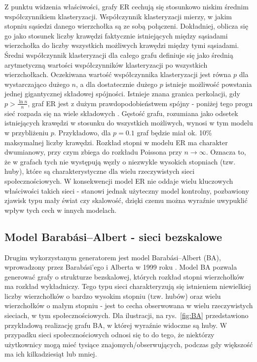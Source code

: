 Z punktu widzenia właściwości, grafy ER cechują się stosunkowo niskim średnim współczynnikiem klasteryzacji.
Współczynnik klasteryzacji mierzy, w jakim stopniu sąsiedzi danego wierzchołka są ze sobą połączeni. 
Dokładniej, oblicza się go jako stosunek liczby krawędzi faktycznie istniejących między sąsiadami wierzchołka do liczby wszystkich możliwych krawędzi między tymi sąsiadami. 
Średni współczynnik klasteryzacji dla całego grafu definiuje się jako średnią arytmetyczną wartości współczynników klasteryzacji po wszystkich wierzchołkach.
Oczekiwana wartość współczynnika klasteryzacji jest równa $p$ dla wystarczająco dużego $n$, a dla dostatecznie dużego $p$ istnieje możliwość powstania jednej gigantycznej składowej spójności.
Istnieje znana granica perkolacji, gdy $p>\frac{\ln n}{n}$, graf ER jest z dużym prawdopodobieństwem spójny - poniżej tego progu sieć rozpada się na wiele składowych \cite{ErdosRenyi1960}. Gęstość grafu, rozumiana jako odsetek istniejących krawędzi w stosunku do wszystkich możliwych, wynosi w tym modelu w przybliżeniu $p$. Przykładowo, dla $p=0.1$ graf będzie miał ok. 10\% maksymalnej liczby krawędzi. Rozkład stopni w modelu ER ma charakter dwumianowy, przy czym zbiega do rozkładu Poissona przy $n\to\infty$. Oznacza to, że w grafach tych nie występują węzły o niezwykle wysokich stopniach (tzw. huby), które są charakterystyczne dla wielu rzeczywistych sieci społecznościowych. W konsekwencji model ER nie oddaje wielu kluczowych właściwości takich sieci - stanowi jednak użyteczny model kontrolny, pozbawiony zjawisk typu mały świat czy skalowość, dzięki czemu można wyraźnie uwypuklić wpływ tych cech w innych modelach.


\subsection{Model Barabási--Albert - sieci bezskalowe}
Drugim wykorzystanym generatorem jest model Barabási--Albert (BA), wprowadzony przez Barabási'ego i Alberta w 1999 roku \cite{barabasi1999emergence}. Model BA pozwala generować grafy o strukturze bezskalowej, których rozkład stopni wierzchołków ma rozkład wykładniczy. Tego typu sieci charakteryzują się istnieniem niewielkiej liczby wierzchołków o bardzo wysokim stopniu (tzw. hubów) oraz wielu wierzchołków o małym stopniu - jest to cecha obserwowana w wielu rzeczywistych sieciach, w tym społecznościowych. Dla ilustracji, na rys.~\ref{fig:BA} przedstawiono przykładową realizację grafu BA, w której wyraźnie widoczne są huby. W przypadku sieci społecznościowych odnosi się to do tego, że niektórzy użytkownicy mogą mieć tysiące znajomych/obserwujących, podczas gdy większość ma ich kilkadziesiąt lub mniej.

